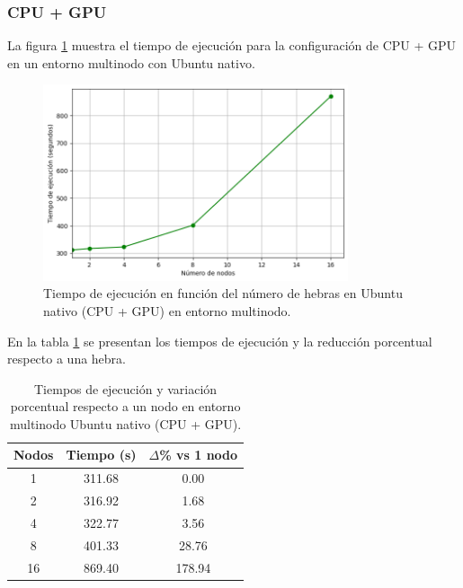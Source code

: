 \subsubsection{CPU + GPU}

La figura \ref{fig:multi-node_ubuntu_gpu_native_time} muestra el tiempo de ejecución para la configuración de CPU + GPU en un entorno multinodo con Ubuntu nativo.

\begin{figure}[H]
    \centering
    \includegraphics[width=0.8\textwidth]{imagenes/cap5/multi-node_ubuntu_gpu_native_time.png}
    \caption{Tiempo de ejecución en función del número de hebras en Ubuntu nativo (CPU + GPU) en entorno multinodo.}
    \label{fig:multi-node_ubuntu_gpu_native_time}
\end{figure}

En la tabla \ref{tab:multi-node_ubuntu_gpu_native} se presentan los tiempos de ejecución y la reducción porcentual respecto a una hebra.

\begin{table}[ht]
    \centering
    \begin{tabular}{|c|c|c|}
        \hline
        \textbf{Nodos} & \textbf{Tiempo (s)} & \textbf{$\Delta$\% vs 1 nodo} \\
        \hline
        1              & 311.68              & 0.00                          \\
        2              & 316.92              & 1.68                          \\
        4              & 322.77              & 3.56                          \\
        8              & 401.33              & 28.76                         \\
        16             & 869.40              & 178.94                        \\
        \hline
    \end{tabular}
    \caption{Tiempos de ejecución y variación porcentual respecto a un nodo en entorno multinodo Ubuntu nativo (CPU + GPU).}
    \label{tab:multi-node_ubuntu_gpu_native}
\end{table}

